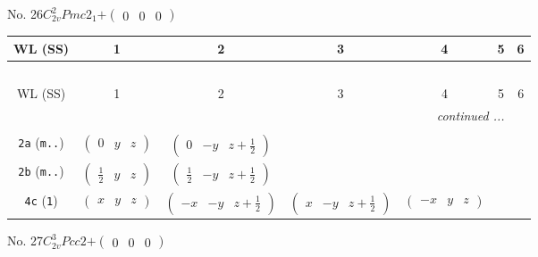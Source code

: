 \documentclass[fleqn,9pt,landscape]{jsarticle}
\begin{document}
\newpage
No. 26\quad$C_{2v}^{2}$\quad$Pmc2_1$\quad[ orthorhombic ]\quad$+\begin{pmatrix} 0 & 0 & 0 \end{pmatrix}$
\begin{center}
\renewcommand{\arraystretch}{1.2}
\begin{longtable}{ccccccc}
 \hline \hline
WL (SS) & 1 & 2 & 3 & 4 & 5 & 6 \\ \hline \endfirsthead

\multicolumn{6}{l}{\tablename\ \thetable{}} \\
 \hline \hline
WL (SS) & 1 & 2 & 3 & 4 & 5 & 6 \\ \hline \endhead

 \hline \hline
\multicolumn{6}{r}{\footnotesize\it continued ...} \\ \endfoot

 \hline \hline
\multicolumn{6}{r}{} \\ \endlastfoot

{\tt 2a} ({\tt m..}) & $ \begin{pmatrix} 0 & y & z \end{pmatrix} $ & $ \begin{pmatrix} 0 & - y & z + \frac{1}{2} \end{pmatrix} $ & $  $ & $  $ \\ \hline
{\tt 2b} ({\tt m..}) & $ \begin{pmatrix} \frac{1}{2} & y & z \end{pmatrix} $ & $ \begin{pmatrix} \frac{1}{2} & - y & z + \frac{1}{2} \end{pmatrix} $ & $  $ & $  $ \\ \hline
{\tt 4c} ({\tt 1}) & $ \begin{pmatrix} x & y & z \end{pmatrix} $ & $ \begin{pmatrix} - x & - y & z + \frac{1}{2} \end{pmatrix} $ & $ \begin{pmatrix} x & - y & z + \frac{1}{2} \end{pmatrix} $ & $ \begin{pmatrix} - x & y & z \end{pmatrix} $ \\
\end{longtable}
\end{center}
\newpage
No. 27\quad$C_{2v}^{3}$\quad$Pcc2$\quad[ orthorhombic ]\quad$+\begin{pmatrix} 0 & 0 & 0 \end{pmatrix}$
\end{document}
